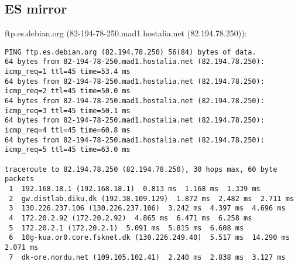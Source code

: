 \documentclass{acm_proc_article-sp}
\begin{document}
\subsection{ES mirror}
ftp.es.debian.org (82-194-78-250.mad1.hostalia.net (82.194.78.250)):
\begin{verbatim}
PING ftp.es.debian.org (82.194.78.250) 56(84) bytes of data.
64 bytes from 82-194-78-250.mad1.hostalia.net (82.194.78.250): icmp_req=1 ttl=45 time=53.4 ms
64 bytes from 82-194-78-250.mad1.hostalia.net (82.194.78.250): icmp_req=2 ttl=45 time=50.0 ms
64 bytes from 82-194-78-250.mad1.hostalia.net (82.194.78.250): icmp_req=3 ttl=45 time=50.1 ms
64 bytes from 82-194-78-250.mad1.hostalia.net (82.194.78.250): icmp_req=4 ttl=45 time=60.8 ms
64 bytes from 82-194-78-250.mad1.hostalia.net (82.194.78.250): icmp_req=5 ttl=45 time=63.0 ms

traceroute to 82.194.78.250 (82.194.78.250), 30 hops max, 60 byte packets
 1  192.168.18.1 (192.168.18.1)  0.813 ms  1.168 ms  1.339 ms
 2  gw.distlab.diku.dk (192.38.109.129)  1.872 ms  2.482 ms  2.711 ms
 3  130.226.237.106 (130.226.237.106)  3.242 ms  4.397 ms  4.696 ms
 4  172.20.2.92 (172.20.2.92)  4.865 ms  6.471 ms  6.258 ms
 5  172.20.2.1 (172.20.2.1)  5.091 ms  5.815 ms  6.608 ms
 6  10g-kua.or0.core.fsknet.dk (130.226.249.40)  5.517 ms  14.290 ms  2.071 ms
 7  dk-ore.nordu.net (109.105.102.41)  2.240 ms  2.838 ms  3.127 ms
\end{verbatim}
\newpage
$ $
\newpage
\end{document}
